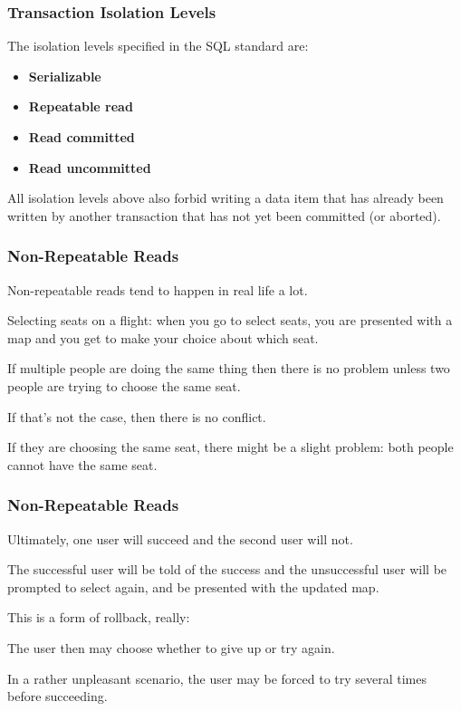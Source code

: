 \begin{frame}
\frametitle{Transaction Isolation Levels}

The isolation levels specified in the SQL standard are:
\begin{itemize}
	\item \textbf{Serializable}
	\item \textbf{Repeatable read}
	\item \textbf{Read committed}
	\item \textbf{Read uncommitted}
\end{itemize}

All isolation levels above also forbid writing a data item that has already been written by another transaction that has not yet been committed (or aborted).

\end{frame}

\begin{frame}
\frametitle{Non-Repeatable Reads}

Non-repeatable reads tend to happen in real life a lot.

Selecting seats on a flight: when you go to select seats, you are presented with a map and you get to make your choice about which seat. 

If multiple people are doing the same thing then there is no problem unless two people are trying to choose the same seat. 

If that's not the case, then there is no conflict. 

If they are choosing the same seat, there might be a slight problem: both people cannot have the same seat.


\end{frame}

\begin{frame}
\frametitle{Non-Repeatable Reads}

Ultimately, one user will succeed and the second user will not. 

The successful user will be told of the success and the unsuccessful user will be prompted to select again, and be presented with the updated map. 

This is a form of rollback, really:

The user then may choose whether to give up or try again. 

In a rather unpleasant scenario, the user may be forced to try several times before succeeding.

\end{frame}

